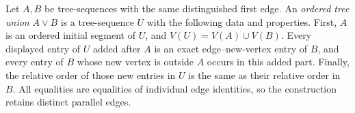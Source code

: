 \begin{definition}
Let $A,B$ be tree-sequences with the same distinguished first edge.  An
\emph{ordered tree union} $A\vee B$ is a tree-sequence $U$ with the
following data and properties.
First, $A$ is an ordered initial segment of $U$, and
$V(U)=V(A)\cup V(B)$.  Every displayed entry of $U$ added after $A$ is
an exact edge--new-vertex entry of $B$, and every entry of $B$ whose new
vertex is outside $A$ occurs in this added part.  Finally, the relative
order of those new entries in $U$ is the same as their relative order in
$B$.  All equalities are equalities of individual edge identities, so the
construction retains distinct parallel edges.
\end{definition}
